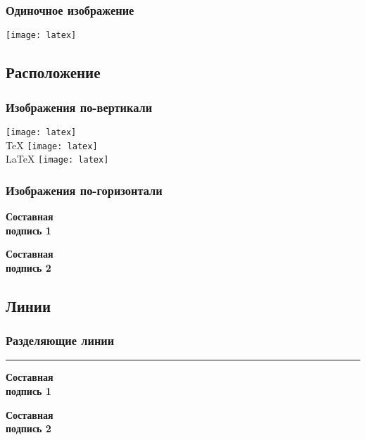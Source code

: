 \begin{frame}
    \frametitle{Одиночное изображение}
    \centering
    \texttt{[image: latex]} %
\end{frame}

\subsection{Расположение}

\begin{frame}
    \frametitle{Изображения по-вертикали}
    \centering
    \vfill
    \texttt{[image: latex]} \\
    \TeX
    \vfill
    \texttt{[image: latex]} \\
    \LaTeX
    \vfill
    \texttt{[image: latex]} \\
    \vfill
\end{frame}


\begin{frame}
    \frametitle{Изображения по-горизонтали}
    \begin{minipage}[t]{0.47\linewidth}
        \textbf{Составная \\ подпись 1}
    \end{minipage}
    \hfill
    \begin{minipage}[t]{0.47\linewidth}
        \textbf{Составная \\ подпись 2}
    \end{minipage}
\end{frame}

\subsection{Линии}

\begin{frame}
    \frametitle{Разделяющие линии}
    \begin{minipage}[c]{0.47\linewidth}
        \bigskip
        \hrule{}
        \bigskip
        \textbf{Составная \\ подпись 1}
    \end{minipage}
    \hfill
    \vrule{}
    \hfill
    \begin{minipage}[c]{0.47\linewidth}
        \flushright
        \textbf{Составная \\ подпись 2}
    \end{minipage}
\end{frame}

